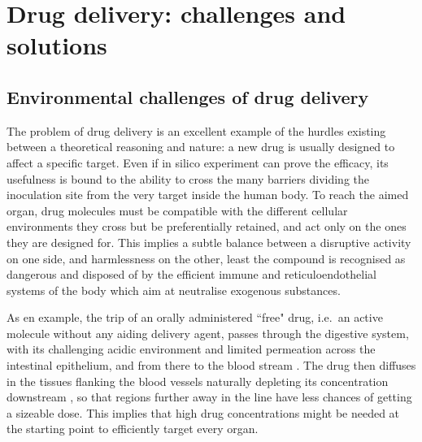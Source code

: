 \clearpage


\section{Drug delivery: challenges and solutions}

\subsection{Environmental challenges of drug delivery}
The problem of drug delivery is an excellent example of the hurdles existing between a theoretical reasoning and nature: a new drug is usually designed to affect a specific target. Even if in silico experiment can prove the efficacy, its usefulness is bound to the ability to cross the many barriers dividing the inoculation site from the very target inside the human body.
%
To reach the aimed organ, drug molecules must be compatible with the different cellular environments they cross but be preferentially retained, and act only on the ones they are designed for. This implies a subtle balance between a disruptive activity on one side, and harmlessness on the other, least the compound is recognised as dangerous and disposed of by the efficient immune and reticuloendothelial systems of the body which aim at neutralise exogenous substances.

As en example, the trip of an orally  administered ``free" drug, i.e.\ an active molecule without any aiding delivery agent, passes through the digestive system, with its challenging acidic environment and limited permeation across the intestinal epithelium, and from there to the blood stream \cite{Masaoka2006, Mitragotri2014}. The drug then diffuses in the tissues flanking the blood vessels naturally depleting its concentration downstream \cite{Krol2012}, so that regions further away in the line have less chances of getting a sizeable dose. This implies that high drug concentrations might be needed at the starting point to efficiently target every organ.


